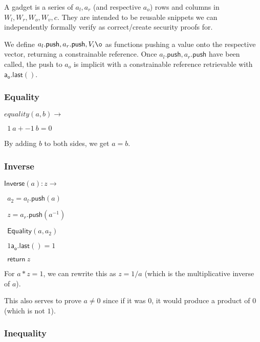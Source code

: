 \documentclass[]{article}
\begin{document}
A gadget is a series of $a_l, a_r$ (and respective $a_o$) rows and columns in $W_l, W_r, W_o, W_v, c$. They are intended to be reusable snippets we can independently formally verify as correct/create security proofs for.

\newcommand{\p}{\mathsf{.push}}
\newcommand{\al}{a_l\p}
\newcommand{\ar}{a_r\p}
\newcommand{\aol}{\mathsf{a_o.last()}}

We define $\al, \ar, V_i\o$ as functions pushing a value onto the respective vector, returning a constrainable reference. Once $\al, \ar$ have been called, the push to $a_o$ is implicit with a constrainable reference retrievable with $\aol$.

\newcommand{\all}{\mathsf{a_l.last()}}
\newcommand{\arl}{\mathsf{a_r.last()}}

\newpage

\subsubsection{Equality}

\newcommand{\equality}{\mathsf{Equality}}

$equality(a, b) \rightarrow$

$~~1 ~a + -1 ~b = 0$

By adding $b$ to both sides, we get $a = b$.

\subsubsection{Inverse}

\newcommand{\inverse}{\mathsf{Inverse}}

$\inverse(a): z \rightarrow$

$~~a_2 = \al(a)$

$~~z = \ar(a^{-1})$

$~~\equality(a, a_2)$

$~~1 \aol = 1$

$~~\mathsf{return} ~z$

For $a * z = 1$, we can rewrite this as $z = 1/a$ (which is the multiplicative inverse of $a$).

This also serves to prove $a \ne 0$ since if it was $0$, it would produce a product of $0$ (which is not $1$).

\subsubsection{Inequality}

\newcommand{\inequality}{\mathsf{Inequality}}
\end{document}

